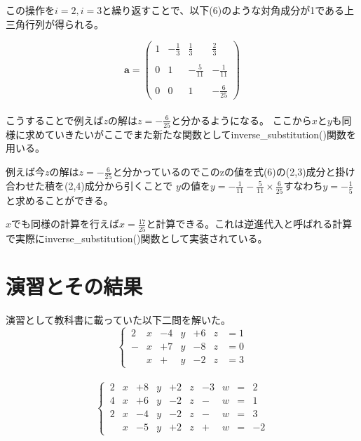 \documentclass[a4paper,11pt]{jsarticle}
\begin{document}
この操作を$i=2,i=3$と繰り返すことで、以下(6)のような対角成分が1である上三角行列が得られる。

\begin{equation}
    \textbf{a} = 
    \left (
    \begin{array}{ccc|c}
        1 & \displaystyle -\frac{1}{3} & \displaystyle \frac{1}{3} & \displaystyle \frac{2}{3} \\ \\
        0 & 1 & -\displaystyle \frac{5}{11} & \displaystyle -\frac{1}{11} \\ \\
        0 & 0 & 1 & \displaystyle -\frac{6}{25}
    \end{array}
    \right )
\end{equation}
\\

こうすることで例えば$z$の解は$z=-\tfrac{6}{25}$と分かるようになる。
ここから$x$と$y$も同様に求めていきたいがここでまた新たな関数としてinverse\_substitution()関数を用いる。

例えば今$z$の解は$z=-\tfrac{6}{25}$と分かっているのでこのzの値を式(6)の(2,3)成分と掛け合わせた積を(2,4)成分から引くことで
$y$の値を$y = -\tfrac{1}{11} - \tfrac{5}{11}\times\tfrac{6}{25}$すなわち$y=-\tfrac{1}{5}$と求めることができる。

$x$でも同様の計算を行えば$x=\tfrac{17}{25}$と計算できる。これは逆進代入と呼ばれる計算で実際にinverse\_substitution()関数として実装されている。

\section{演習とその結果}
演習として教科書に載っていた以下二問を解いた。
\begin{equation}
    \left \{ \,
    \begin{aligned}
        2&x& - 4&y& + 6&z &= 1 \\
        - &x& + 7&y& - 8&z &= 0 \\
        &x& + &y& - 2&z &= 3
    \end{aligned}
    \right .
\end{equation}
\\
\begin{equation}
    \left \{ \,
    \begin{aligned}
        2&x& +8&y& +2&z& -3&w&=& 2 \\
        4&x& +6&y& -2&z& -&w&=& 1 \\
        2&x& -4&y& -2&z& -&w&=& 3 \\
        &x&  -5&y& +2&z& +&w&=& -2
    \end{aligned}
    \right .
\end{equation}
\\
\end{document}
